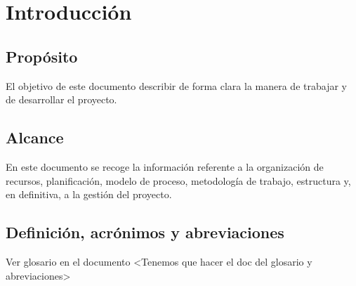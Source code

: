 \chapter{Introducción}
\section{Propósito}
El objetivo de este documento describir de forma clara la manera de trabajar y de desarrollar el proyecto.
\section{Alcance}
En este documento se recoge la información referente a la organización de recursos, planificación, modelo de proceso, metodología de trabajo, estructura y, en definitiva, a la gestión del proyecto.
\section{Definición, acrónimos y abreviaciones}
Ver glosario en el documento <Tenemos que hacer el doc del glosario y abreviaciones>
